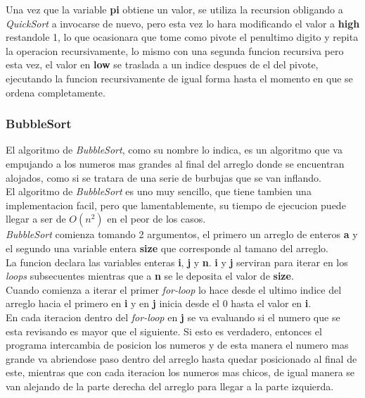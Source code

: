 \documentclass{article}
\begin{document}
				Una vez que la variable \textbf{pi} obtiene un valor, se utiliza la recursion obligando a \emph{QuickSort} a invocarse de nuevo, pero esta vez lo hara modificando el valor a \textbf{high} restandole 1, lo que ocasionara que tome como pivote el penultimo digito y repita la operacion recursivamente, lo mismo con una segunda funcion recursiva pero esta vez, el valor en \textbf{low} se traslada a un indice despues de el del pivote, ejecutando la funcion recursivamente de igual forma hasta el momento en que se ordena completamente.\\
				
			
			\subsubsection{BubbleSort}
			
				El algoritmo de \emph{BubbleSort}, como su nombre lo indica, es un algoritmo que va empujando a los numeros mas grandes al final del arreglo donde se encuentran alojados, como si se tratara de una serie de burbujas que se van inflando.\\
				
				El algoritmo de \emph{BubbleSort} es uno muy sencillo, que tiene tambien una implementacion facil, pero que lamentablemente, su tiempo de ejecucion puede llegar a ser de $O(n^2)$ en el peor de los casos.\\
				
				\emph{BubbleSort} comienza tomando 2 argumentos, el primero un arreglo de enteros \textbf{a} y el segundo una variable entera \textbf{size} que corresponde al tamano del arreglo.\\
				
				La funcion declara las variables enteras \textbf{i}, \textbf{j} y \textbf{n}. \textbf{i} y \textbf{j} serviran para iterar en los \emph{loops} subsecuentes mientras que a \textbf{n} se le deposita el valor de \textbf{size}.\\
				
				Cuando comienza a iterar el primer \emph{for-loop} lo hace desde el ultimo indice del arreglo hacia el primero en \textbf{i} y en \textbf{j} inicia desde el 0 hasta el valor en \textbf{i}.\\
				
				En cada iteracion dentro del \emph{for-loop} en \textbf{j} se va evaluando si el numero que se esta revisando es mayor que el siguiente. Si esto es verdadero, entonces el programa intercambia de posicion los numeros y de esta manera el numero mas grande va abriendose paso dentro del arreglo hasta quedar posicionado al final de este, mientras que con cada iteracion los numeros mas chicos, de igual manera se van alejando de la parte derecha del arreglo para llegar a la parte izquierda.\\
				
\end{document}

